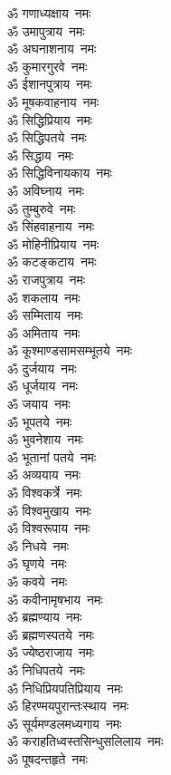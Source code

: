\begin{multicols}{2}
\begin{flushleft}
ॐ गणाध्यक्षाय~नमः\\
ॐ उमापुत्राय~नमः\\
ॐ अघनाशनाय~नमः\\
ॐ कुमारगुरवे~नमः\\
ॐ ईशानपुत्राय~नमः\\
ॐ मूषकवाहनाय~नमः\\
ॐ सिद्धिप्रियाय~नमः\\
ॐ सिद्धिपतये~नमः\\
ॐ सिद्धाय~नमः\hfill{}\\
ॐ सिद्धिविनायकाय~नमः\\
ॐ अविघ्नाय~नमः\\
ॐ तुम्बुरुवे~नमः\\
ॐ सिंहवाहनाय~नमः\\
ॐ मोहिनीप्रियाय~नमः\\
ॐ कटङ्कटाय~नमः\\
ॐ राजपुत्राय~नमः\\
ॐ शकलाय~नमः\\
ॐ सम्मिताय~नमः\\
ॐ अमिताय~नमः\hfill{}\\
ॐ कूश्माण्डसामसम्भूतये~नमः\\
ॐ दुर्जयाय~नमः\\
ॐ धूर्जयाय~नमः\\
ॐ जयाय~नमः\\
ॐ भूपतये~नमः\\
ॐ भुवनेशाय~नमः\\
ॐ भूतानां पतये~नमः\\
ॐ अव्ययाय~नमः\\
ॐ विश्वकर्त्रे~नमः\\
ॐ विश्वमुखाय~नमः\hfill{}\\
ॐ विश्वरूपाय~नमः\\
ॐ निधये~नमः\\
ॐ घृणये~नमः\\
ॐ कवये~नमः\\
ॐ कवीनामृषभाय~नमः\\
ॐ ब्रह्मण्याय~नमः\\
ॐ ब्रह्मणस्पतये~नमः\\
ॐ ज्येष्ठराजाय~नमः\\
ॐ निधिपतये~नमः\\
ॐ निधिप्रियपतिप्रियाय~नमः\hfill{}\\
ॐ हिरण्मयपुरान्तःस्थाय~नमः\\
ॐ सूर्यमण्डलमध्यगाय~नमः\\
ॐ कराहतिध्वस्तसिन्धुसलिलाय~नमः\\
ॐ पूषदन्तहृते~नमः\\

\end{flushleft}
\end{multicols}
